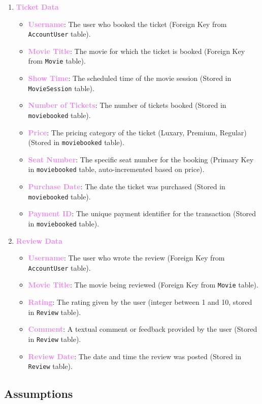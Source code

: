 \documentclass[a4paper,12pt]{article}  %
\renewcommand{\textbf}[1]{\textcolor{violet}{\bfseries #1}}
\begin{document}
\begin{enumerate}
    \item \textbf{Ticket Data}
    \begin{itemize}
        \item \textbf{Username}: The user who booked the ticket (Foreign Key from \texttt{AccountUser} table).
        \item \textbf{Movie Title}: The movie for which the ticket is booked (Foreign Key from \texttt{Movie} table).
        \item \textbf{Show Time}: The scheduled time of the movie session (Stored in \texttt{MovieSession} table).
        \item \textbf{Number of Tickets}: The number of tickets booked (Stored in \texttt{moviebooked} table).
        \item \textbf{Price}: The pricing category of the ticket (Luxary, Premium, Regular) (Stored in \texttt{moviebooked} table).
        \item \textbf{Seat Number}: The specific seat number for the booking (Primary Key in \texttt{moviebooked} table, auto-incremented based on price).
        \item \textbf{Purchase Date}: The date the ticket was purchased (Stored in \texttt{moviebooked} table).
        \item \textbf{Payment ID}: The unique payment identifier for the transaction (Stored in \texttt{moviebooked} table).
    \end{itemize}
    
    \item \textbf{Review Data}
    \begin{itemize}
        \item \textbf{Username}: The user who wrote the review (Foreign Key from \texttt{AccountUser} table).
        \item \textbf{Movie Title}: The movie being reviewed (Foreign Key from \texttt{Movie} table).
        \item \textbf{Rating}: The rating given by the user (integer between 1 and 10, stored in \texttt{Review} table).
        \item \textbf{Comment}: A textual comment or feedback provided by the user (Stored in \texttt{Review} table).
        \item \textbf{Review Date}: The date and time the review was posted (Stored in \texttt{Review} table).
    \end{itemize}
\end{enumerate}


\subsection{Assumptions}
\end{document}
